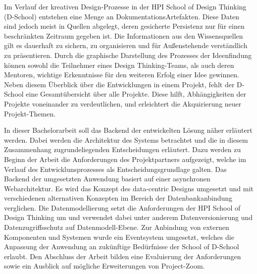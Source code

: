 
Im Verlauf der kreativen Design-Prozesse in der HPI School of Design Thinking (D-School) entstehen eine Menge an Dokumentations\gls{Artefakt}en. Diese Daten sind jedoch meist in Quellen abgelegt, deren gesicherte Persistenz nur für einen beschränkten Zeitraum gegeben ist. Die Informationen aus den Wissensquellen gilt es dauerhaft zu sichern, zu organisieren und für Außenstehende verständlich zu präsentieren. Durch die graphische Darstellung des Prozesses der Ideenfindung können sowohl die Teilnehmer eines Design Thinking-Teams, als auch deren Mentoren, wichtige Erkenntnisse für den weiteren Erfolg einer Idee gewinnen. Neben diesem Überblick über die Entwicklungen in einem Projekt, fehlt der D-School eine Gesamtübersicht über alle Projekte. Diese hilft, Abhängigkeiten der Projekte voneinander zu verdeutlichen, und erleichtert die Akquirierung neuer Projekt-Themen. 

In dieser Bachelorarbeit soll das \gls{Backend} der entwickelten Lösung  näher erläutert werden. Dabei werden die Architektur des Systems betrachtet und die in diesem Zusammenhang zugrundeliegenden Entscheidungen erläutert. Dazu werden zu Beginn der Arbeit die Anforderungen des Projektpartners aufgezeigt, welche im Verlauf des Entwicklunsprozesses als Entscheidungsgrundlage galten. Das \gls{Backend} der umgesetzten Anwendung basiert auf einer asynchronen Webarchitektur. Es wird das Konzept des data-centric Designs umgesetzt und mit verschiedenen alternativen Konzepten im Bereich der Datenbankanbindung verglichen. Die Datenmodellierung setzt die Anforderungen der HPI School of Design Thinking um und verwendet dabei unter anderem Datenversionierung und Datenzugriffsschutz auf Datenmodell-Ebene. Zur Anbindung von externen Komponenten und Systemen wurde ein \gls{Eventsystem} umgesetzt, welches die Anpassung der Anwendung an zukünftige Bedürfnisse der School of D-School erlaubt. Den Abschluss der Arbeit bilden eine Evaluierung der Anforderungen sowie ein Ausblick auf mögliche Erweiterungen von Project-Zoom.
